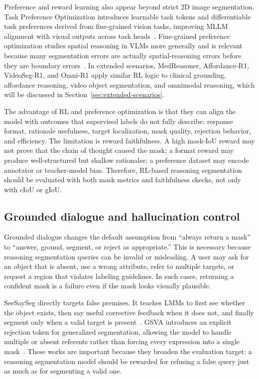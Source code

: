 Preference and reward learning also appear beyond strict 2D image segmentation. Task Preference Optimization introduces learnable task tokens and differentiable task preferences derived from fine-grained vision tasks, improving MLLM alignment with visual outputs across task heads~\citep{yanTaskPreferenceOptimization2025}. Fine-grained preference optimization studies spatial reasoning in VLMs more generally and is relevant because many segmentation errors are actually spatial-reasoning errors before they are boundary errors~\citep{shenFinegrainedPreferenceOptimization2026}. In extended scenarios, MedReasoner, Affordance-R1, VideoSeg-R1, and Omni-R1 apply similar RL logic to clinical grounding, affordance reasoning, video object segmentation, and omnimodal reasoning, which will be discussed in Section~\ref{sec:extended-scenarios}.

The advantage of RL and preference optimization is that they can align the model with outcomes that supervised labels do not fully describe: response format, rationale usefulness, target localization, mask quality, rejection behavior, and efficiency. The limitation is reward faithfulness. A high mask-IoU reward may not prove that the chain of thought caused the mask; a format reward may produce well-structured but shallow rationales; a preference dataset may encode annotator or teacher-model bias. Therefore, RL-based reasoning segmentation should be evaluated with both mask metrics and faithfulness checks, not only with cIoU or gIoU.

\subsection{Grounded dialogue and hallucination control}

Grounded dialogue changes the default assumption from ``always return a mask'' to ``answer, ground, segment, or reject as appropriate.'' This is necessary because reasoning segmentation queries can be invalid or misleading. A user may ask for an object that is absent, use a wrong attribute, refer to multiple targets, or request a region that violates labeling guidelines. In such cases, returning a confident mask is a failure even if the mask looks visually plausible.

SeeSaySeg directly targets false premises. It teaches LMMs to first see whether the object exists, then say useful corrective feedback when it does not, and finally segment only when a valid target is present~\citep{wuSeeSaySegment2024}. GSVA introduces an explicit rejection token for generalized segmentation, allowing the model to handle multiple or absent referents rather than forcing every expression into a single mask~\citep{xiaGsvaGeneralizedSegmentation2024}. These works are important because they broaden the evaluation target: a reasoning segmentation model should be rewarded for refusing a false query just as much as for segmenting a valid one.

